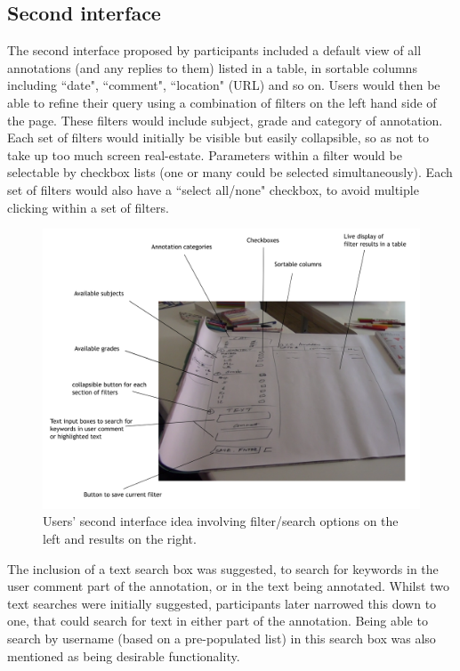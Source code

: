 \subsection{Second interface}
The second interface proposed by participants included a default view of all annotations (and any replies to them) listed in a table, in sortable columns including ``date", ``comment", ``location" (URL) and so on. Users would then be able to refine their query using a combination of filters on the left hand side of the page. These filters would include subject, grade and category of annotation. Each set of filters would initially be visible but easily collapsible, so as not to take up too much screen real-estate. Parameters within a filter would be selectable by checkbox lists (one or many could be selected simultaneously). Each set of filters would also have a ``select all/none" checkbox, to avoid multiple clicking within a set of filters.
\begin{figure}[h!]
    \centering
    \includegraphics[width=\textwidth]{Figures/PD1shot4labels.png}
 \caption{Users' second interface idea involving filter/search options on the left and results on the right.}
\end{figure}

The inclusion of a text search box was suggested, to search for keywords in the user comment part of the annotation, or in the text being annotated. Whilst two text searches were initially suggested, participants later narrowed this down to one, that could search for text in either part of the annotation. Being able to search by username (based on a pre-populated list) in this search box was also mentioned as being desirable functionality. 

